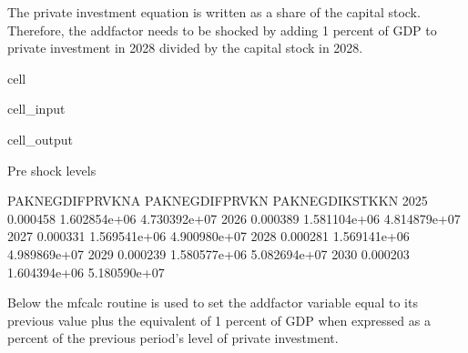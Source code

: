 \documentclass[letterpaper,10pt,english]{jupyterBook}
\begin{document}
\sphinxAtStartPar
The private investment equation is written as a share of the capital stock.  Therefore, the add\sphinxhyphen{}factor needs to be shocked by adding 1 percent of GDP to private investment in 2028 divided by the capital stock in 2028.

\begin{sphinxuseclass}{cell}\begin{sphinxVerbatimInput}

\begin{sphinxuseclass}{cell_input}
\begin{sphinxVerbatim}[commandchars=\\\{\}]

\PYG{p}{[}\PYG{p}{[}\PYG{p}{]}\PYG{p}{]}

\end{sphinxVerbatim}

\end{sphinxuseclass}\end{sphinxVerbatimInput}
\begin{sphinxVerbatimOutput}

\begin{sphinxuseclass}{cell_output}
\begin{sphinxVerbatim}[commandchars=\\\{\}]
Pre shock levels
\end{sphinxVerbatim}

\begin{sphinxVerbatim}[commandchars=\\\{\}]
      PAKNEGDIFPRVKN\PYGZus{}A  PAKNEGDIFPRVKN  PAKNEGDIKSTKKN
2025         \PYGZhy{}0.000458    1.602854e+06    4.730392e+07
2026         \PYGZhy{}0.000389    1.581104e+06    4.814879e+07
2027         \PYGZhy{}0.000331    1.569541e+06    4.900980e+07
2028         \PYGZhy{}0.000281    1.569141e+06    4.989869e+07
2029         \PYGZhy{}0.000239    1.580577e+06    5.082694e+07
2030         \PYGZhy{}0.000203    1.604394e+06    5.180590e+07
\end{sphinxVerbatim}

\end{sphinxuseclass}\end{sphinxVerbatimOutput}

\end{sphinxuseclass}
\sphinxAtStartPar
Below the mfcalc routine is used to set the addfactor variable equal to its previous value plus the equivalent of 1 percent of GDP when expressed as a percent of the previous period’s level of private investment.
\end{document}
